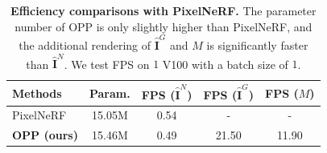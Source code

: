

\begin{table}[t]
\setlength{\abovecaptionskip}{0cm}
    \footnotesize
     \caption{\textbf{Efficiency comparisons with PixelNeRF.} The parameter number of OPP is only slightly higher than PixelNeRF, and the additional rendering of $\hat{\textbf{I}}^{G}$ and $M$ is significantly faster than $\hat{\textbf{I}}^{N}$. We test FPS on $1$ V100 with a batch size of $1$. }
    \label{tab:ablation_efficiency}
    \centering
    \small
     \setlength\tabcolsep{6.5pt}
        \begin{tabular}{l|cccc}
        \rowcolor[gray]{.9}
        \hline
        Methods           &  Param.   & FPS ($\hat{\textbf{I}}^{N}$) & FPS ($\hat{\textbf{I}}^{G}$)   & FPS ($M$)   \\ \hline \hline
        PixelNeRF~\cite{PixelNeRF_yu2021pixelnerf}   & 15.05M  &  0.54 &   -     &   -             \\
        \textbf{OPP (ours)} & 15.46M & 0.49  &  21.50 &  11.90 \\ 
        \hline
        \end{tabular}
\end{table}


